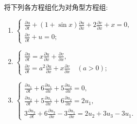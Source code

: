 \begin{exercise}
  将下列各方程组化为对角型方程组:
  \begin{enumerate}[(1)]
    \item $\begin{cases}
             \frac{\partial u}{\partial t} + (1+\sin x)\frac{\partial u}{\partial x}
                + 2 \frac{\partial v}{\partial x} + x = 0, \\
             \frac{\partial v}{\partial t} + u = 0;  
           \end{cases}$
    \item $\begin{cases}
             \frac{\partial u}{\partial t} = x \frac{\partial u}{\partial x}
               + \frac{\partial v}{\partial x}, \\
             \frac{\partial v}{\partial t} = a^2 \frac{\partial u}{\partial x}
               + x \frac{\partial v}{\partial x}\quad (a>0);
           \end{cases}$
    \item $\begin{cases}
             \frac{\partial u_1}{\partial t} + 6 \frac{\partial u_1}{\partial x}
               + 5 \frac{\partial u_2}{\partial x} = 0, \\
             \frac{\partial u_2}{\partial t} + 5 \frac{\partial u_1}{\partial x}
               + 6 \frac{\partial u_2}{\partial x} = 2u_1, \\
             3 \frac{\partial u_3}{\partial t} + 6 \frac{\partial u_3}{\partial x}
               - 3 \frac{\partial u_1}{\partial x} = 2u_2 + 3u_3 - 3u_1.
           \end{cases}$
  \end{enumerate}
\end{exercise}

